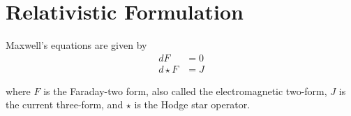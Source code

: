 \documentclass{book}
\begin{document}
	\chapter{Relativistic Formulation}
	Maxwell's equations are given by
	\begin{align}
		dF&=0\\
		d\star F&=J
	\end{align}
	
	where $F$ is the Faraday-two form, also called the electromagnetic two-form, $J$ is the current three-form, and $\star$ is the Hodge star operator.
\end{document}
